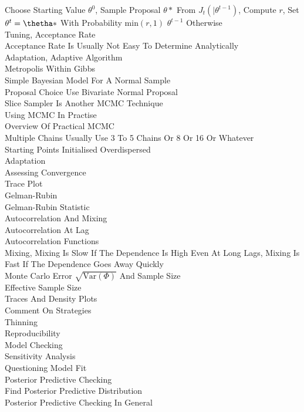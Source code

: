 Choose Starting Value $\theta^0$, Sample Proposal $\theta *$ From $J_t(|\theta^{t-1})$, Compute $r$, Set $\theta^t=\thetha *$ With Probability min$(r,1)$ $\theta^{t-1}$ Otherwise \\
Tuning, Acceptance Rate \\
Acceptance Rate Is Usually Not Easy To Determine Analytically \\
Adaptation, Adaptive Algorithm \\
Metropolis Within Gibbs \\
Simple Bayesian Model For A Normal Sample \\
Proposal Choice Use Bivariate Normal Proposal \\
Slice Sampler Is Another MCMC Technique \\
Using MCMC In Practise \\
Overview Of Practical MCMC \\
Multiple Chains Usually Use 3 To 5 Chains Or 8 Or 16 Or Whatever \\
Starting Points Initialised Overdispersed \\
Adaptation \\
Assessing Convergence \\
Trace Plot \\
Gelman-Rubin \\
Gelman-Rubin Statistic \\
Autocorrelation And Mixing \\
Autocorrelation At Lag \\
Autocorrelation Functions \\
Mixing, Mixing Is Slow If The Dependence Is High Even At Long Lags, Mixing Is Fast If The Dependence Goes Away Quickly \\
Monte Carlo Error $\sqrt{\text{Var}(\Phi)}$ And Sample Size \\
Effective Sample Size \\
Traces And Density Plots \\
Comment On Strategies \\
Thinning \\
Reproducibility \\
Model Checking \\
Sensitivity Analysis \\
Questioning Model Fit \\
Posterior Predictive Checking \\
Find Posterior Predictive Distribution \\
Posterior Predictive Checking In General \\
